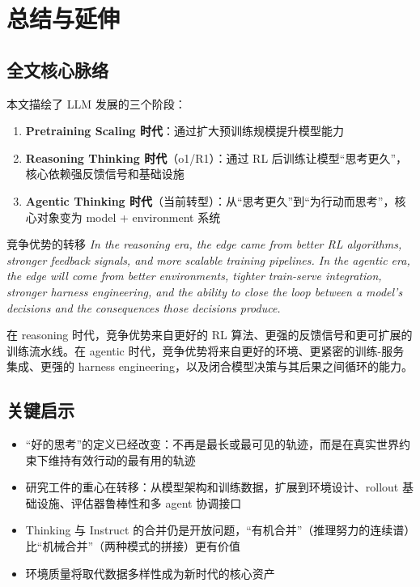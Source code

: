 \section{总结与延伸}

\subsection{全文核心脉络}

本文描绘了 LLM 发展的三个阶段：

\begin{enumerate}
    \item \textbf{Pretraining Scaling 时代}：通过扩大预训练规模提升模型能力
    \item \textbf{Reasoning Thinking 时代}（o1/R1）：通过 RL 后训练让模型``思考更久''，核心依赖强反馈信号和基础设施
    \item \textbf{Agentic Thinking 时代}（当前转型）：从``思考更久''到``为行动而思考''，核心对象变为 model + environment 系统
\end{enumerate}

\begin{importantbox}{竞争优势的转移}
\textit{In the reasoning era, the edge came from better RL algorithms, stronger feedback signals, and more scalable training pipelines. In the agentic era, the edge will come from better environments, tighter train-serve integration, stronger harness engineering, and the ability to close the loop between a model's decisions and the consequences those decisions produce.}

在 reasoning 时代，竞争优势来自更好的 RL 算法、更强的反馈信号和更可扩展的训练流水线。在 agentic 时代，竞争优势将来自更好的环境、更紧密的训练-服务集成、更强的 harness engineering，以及闭合模型决策与其后果之间循环的能力。
\end{importantbox}

\subsection{关键启示}

\begin{itemize}
    \item ``好的思考''的定义已经改变：不再是最长或最可见的轨迹，而是在真实世界约束下维持有效行动的最有用的轨迹
    \item 研究工件的重心在转移：从模型架构和训练数据，扩展到环境设计、rollout 基础设施、评估器鲁棒性和多 agent 协调接口
    \item Thinking 与 Instruct 的合并仍是开放问题，``有机合并''（推理努力的连续谱）比``机械合并''（两种模式的拼接）更有价值
    \item 环境质量将取代数据多样性成为新时代的核心资产
\end{itemize}

